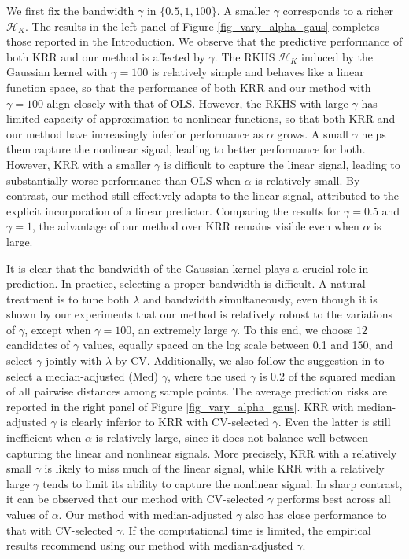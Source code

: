\documentclass[11pt,twoside]{article}
\def\cH{\mathcal H}
\begin{document}
We first fix 
the bandwidth $\gamma$ in  $\{ 0.5, 1, 100\}$. 
A smaller $\gamma$ corresponds to a richer  $\cH_K$.
The results in the left panel of 
Figure \ref{fig_vary_alpha_gaus} completes those reported in the Introduction. 
We observe that the predictive performance of both KRR and our method is affected by  $\gamma$. 
The RKHS $\cH_K$ induced by the Gaussian kernel with  $\gamma=100$  is relatively simple and behaves like a linear function space, so that the performance of both KRR and our method with $\gamma=100$ align closely with that of OLS. However, the RKHS with large $\gamma$ has limited capacity of approximation to nonlinear functions, so that both KRR and our method
have increasingly inferior performance as $\alpha$ grows.  
A small $\gamma$ helps them capture the nonlinear signal, leading to better performance for both. However, KRR with a smaller $\gamma$ is difficult to capture the linear signal, leading to substantially worse performance than OLS when $\alpha$ is relatively small. By contrast, our method still effectively adapts to the linear signal, attributed to the explicit incorporation of a linear predictor.  Comparing the results for $\gamma =0.5$ and $\gamma =1$, the advantage of our method over KRR remains visible even when $\alpha$ is large. 


It is clear that the bandwidth of the Gaussian kernel plays a crucial role in prediction.  
In practice, selecting a proper bandwidth is difficult. 
A natural treatment is to tune both $\lambda$ and bandwidth simultaneously, even though it is shown by our experiments that our method is relatively robust to the variations of $\gamma$, except when $\gamma =100$, an extremely large $\gamma$. 
To this end, 
we choose $12$ candidates of 
$\gamma$ values,  equally spaced on the log scale between 0.1 and 150, and select  $\gamma$ jointly with $\lambda$ by CV.  Additionally, we also 
follow the suggestion in \cite{mukherjee2010learning} to select a median-adjusted (Med) $\gamma$, where the used $\gamma$ is  0.2 of the squared median of all pairwise distances among sample points.
The average prediction risks are reported in the right panel of  Figure \ref{fig_vary_alpha_gaus}. KRR with median-adjusted $\gamma$ is clearly inferior to KRR with CV-selected $\gamma$. Even the latter is still inefficient when $\alpha$ is relatively large, since
it does not balance well between capturing the linear and nonlinear signals. More precisely, KRR with a relatively small $\gamma$ is likely to miss much of the linear signal, while   KRR with a relatively large $\gamma$ tends to limit its ability to capture the nonlinear signal. 
In sharp contrast, 
it can be observed that our method with CV-selected $\gamma$ performs best across all values of $\alpha$.  Our method with median-adjusted $\gamma$ also has close performance to that with   CV-selected $\gamma$.
If the computational time is limited, the empirical results recommend using our method with median-adjusted $\gamma$.  
\end{document}
